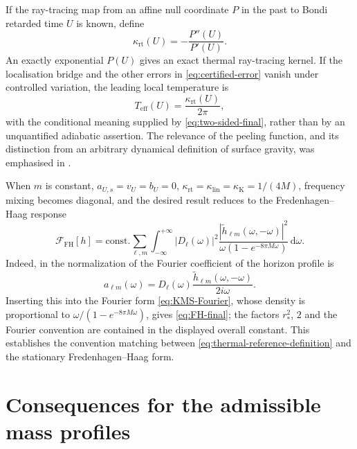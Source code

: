 \documentclass[11pt,a4paper]{article}
\theoremstyle{definition}
\theoremstyle{remark}
\newcommand{\dd}{\mathrm d}
\begin{document}
	If the ray-tracing map from an affine null coordinate $P$ in the past to Bondi
	retarded time $U$ is known, define
	\begin{equation}
		\kappa_{\mathrm{rt}}(U)
		=-\frac{P''(U)}{P'(U)}.
		\label{eq:peeling-function}
	\end{equation}
	An exactly exponential $P(U)$ gives an exact thermal ray-tracing kernel.  If
	the localisation bridge and the other errors in
	\eqref{eq:certified-error} vanish under controlled variation, the leading
	local temperature is
	\begin{equation}
		T_{\mathrm{eff}}(U)=\frac{\kappa_{\mathrm{rt}}(U)}{2\pi},
		\label{eq:effective-temperature}
	\end{equation}
	with the conditional meaning supplied by \eqref{eq:two-sided-final}, rather than by an
	unquantified adiabatic assertion.  The relevance of the peeling function, and
	its distinction from an arbitrary dynamical definition of surface gravity,
	was emphasised in \cite{BarceloLiberatiSonegoVisser2011}.
	
	When $m$ is constant, $a_{U,s}=v_U=b_U=0$,
	$\kappa_{\mathrm{rt}}=\kappa_{\mathrm{lin}}=\kappa_{\mathrm K}=1/(4M)$,
	frequency mixing becomes
	diagonal, and the desired result reduces to the Fredenhagen--Haag response
	\begin{equation}
		\mathcal F_{\mathrm{FH}}[h]
		=\mathrm{const.}
		\sum_{\ell,m}\int_{-\infty}^{+\infty}
		|D_\ell(\omega)|^2
		\frac{|\widetilde h_{\ell m}(\omega,-\omega)|^2}
		{\omega(1-e^{-8\pi M\omega})}\,\dd\omega.
		\label{eq:FH-final}
	\end{equation}
	Indeed, in the normalization of \cite{FredenhagenHaag1990} the Fourier
	coefficient of the horizon profile is
	\begin{equation}
		a_{\ell m}(\omega)
		=D_\ell(\omega)
		\frac{\widetilde h_{\ell m}(\omega,-\omega)}{2i\omega}.
	\end{equation}
	Inserting this into the Fourier form \eqref{eq:KMS-Fourier}, whose density is
	proportional to
	$\omega/(1-e^{-8\pi M\omega})$, gives \eqref{eq:FH-final}; the factors
	$r_*^2$, $2$ and the Fourier convention are contained in the displayed
	overall constant.  This establishes the convention matching between
	\eqref{eq:thermal-reference-definition} and the stationary
	Fredenhagen--Haag form.
	
	\section{Consequences for the admissible mass profiles}
	\label{sec:mass-profile-consequences}
	
\end{document}
